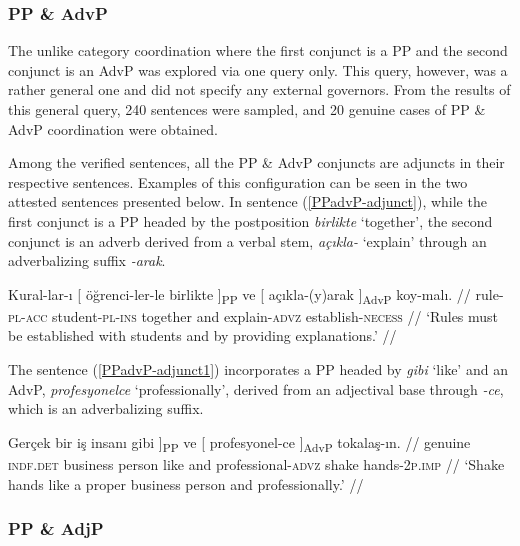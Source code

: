 \subsubsection{PP \& AdvP}

The unlike category coordination where the first conjunct is a PP and the second conjunct is an AdvP was explored via one query only. This query, however, was a rather general one and did not specify any external governors. From the results of this general query, 240 sentences were sampled, and 20 genuine cases of PP \& AdvP coordination were obtained. 

Among the verified sentences, all the PP \& AdvP conjuncts are adjuncts in their respective sentences. Examples of this configuration can be seen in the two attested sentences presented below. In sentence (\ref{PPadvP-adjunct}), while the first conjunct is a PP headed by the postposition \textit{birlikte} `together', the second conjunct is an adverb derived from a verbal stem, \textit{açıkla-} `explain' through an adverbalizing suffix \textit{-arak}. 

\pex[glspace=!1em,everygla={},everyglb={},aboveglbskip=-.15ex, interpartskip=15pt]
\label{PPadvP-adjunct} \begingl
\gla Kural-lar-ı {[} öğrenci-ler-le {birlikte ]\textsubscript{PP}} ve {[} {açıkla-(y)arak ]\textsubscript{AdvP}} koy-malı. //
\glb rule-\textsc{pl}-\textsc{acc} student-\textsc{pl}-\textsc{ins} together and explain-\textsc{advz} establish-\textsc{necess} //
\glft `Rules must be established with students and by providing explanations.' //
\endgl
\xe

The sentence (\ref{PPadvP-adjunct1}) incorporates a PP headed by \textit{gibi} `like' and an AdvP, \textit{profesyonelce} `professionally', derived from an adjectival base through \textit{-ce}, which is an adverbalizing suffix.

\pex[glspace=!1em,everygla={},everyglb={},aboveglbskip=-.15ex, interpartskip=15pt]
\label{PPadvP-adjunct1} \begingl
\gla {[} Gerçek bir iş insanı {gibi ]\textsubscript{PP}} ve {[} {profesyonel-ce ]\textsubscript{AdvP}} tokalaş-ın. //
\glb {}genuine \textsc{indf.det} business person like and {}professional-\textsc{advz} {shake hands}-\textsc{2p.imp} //
\glft `Shake hands like a proper business person and professionally.' //
\endgl
\xe


\subsubsection{PP \& AdjP}

